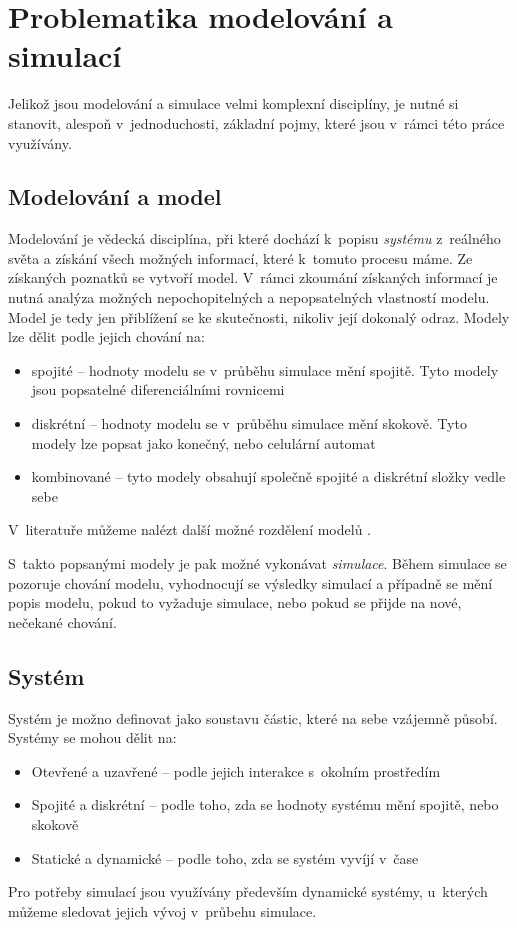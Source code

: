 \section{Problematika modelování a simulací}
Jelikož jsou modelování a simulace velmi komplexní disciplíny, je nutné si stanovit, alespoň v~jednoduchosti, základní pojmy, které jsou v~rámci této práce využívány.

\subsection{Modelování a model}
\label{modelovani}
Modelování je vědecká disciplína, při které dochází k~popisu \textit{systému} z~reálného světa a získání všech možných informací, které k~tomuto procesu máme. Ze získaných poznatků se vytvoří model. V~rámci zkoumání získaných informací je nutná analýza možných nepochopitelných a nepopsatelných vlastností modelu. Model je tedy jen přiblížení se ke skutečnosti, nikoliv její dokonalý odraz. Modely lze dělit podle jejich chování na:

\begin{itemize}
    \item spojité -- hodnoty modelu se v~průběhu simulace mění spojitě. Tyto modely jsou popsatelné diferenciálními rovnicemi
    \item diskrétní -- hodnoty modelu se v~průběhu simulace mění skokově. Tyto modely lze popsat jako konečný, nebo celulární automat
    \item kombinované -- tyto modely obsahují společně spojité a diskrétní složky vedle sebe
\end{itemize}

V~literatuře můžeme nalézt další možné rozdělení modelů \cite{IMS-skripta}.


S~takto popsanými modely je pak možné vykonávat \textit{simulace}. Během simulace se pozoruje chování modelu, vyhodnocují se výsledky simulací a případně se mění popis modelu, pokud to vyžaduje simulace, nebo pokud se přijde na nové, nečekané chování.

\subsection{Systém}
Systém je možno definovat jako soustavu částic, které na sebe vzájemně působí. Systémy se mohou dělit na:

\begin{itemize}
    \item Otevřené a uzavřené -- podle jejich interakce s~okolním prostředím
    \item Spojité a diskrétní -- podle toho, zda se hodnoty systému mění spojitě, nebo skokově
    \item Statické a dynamické -- podle toho, zda se systém vyvíjí v~čase
\end{itemize}
Pro potřeby simulací jsou využívány především dynamické systémy, u~kterých můžeme sledovat jejich vývoj v~průbehu simulace.

